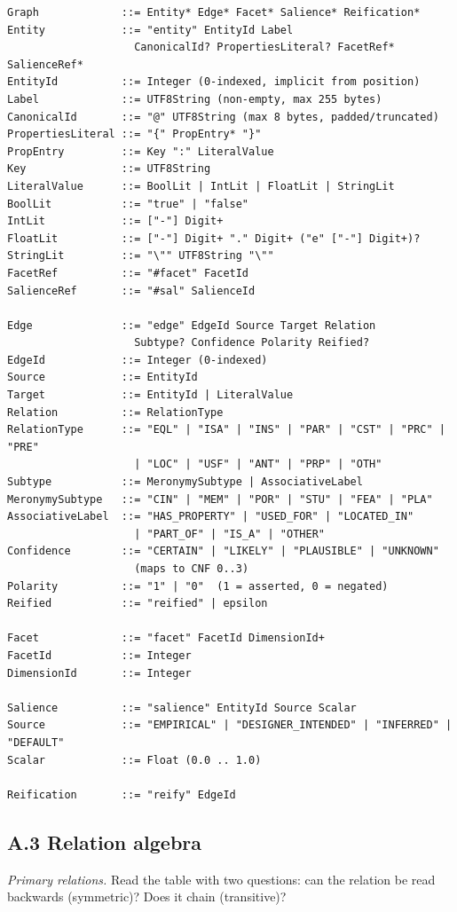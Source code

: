 \begin{verbatim}
Graph             ::= Entity* Edge* Facet* Salience* Reification*
Entity            ::= "entity" EntityId Label
                    CanonicalId? PropertiesLiteral? FacetRef* SalienceRef*
EntityId          ::= Integer (0-indexed, implicit from position)
Label             ::= UTF8String (non-empty, max 255 bytes)
CanonicalId       ::= "@" UTF8String (max 8 bytes, padded/truncated)
PropertiesLiteral ::= "{" PropEntry* "}"
PropEntry         ::= Key ":" LiteralValue
Key               ::= UTF8String
LiteralValue      ::= BoolLit | IntLit | FloatLit | StringLit
BoolLit           ::= "true" | "false"
IntLit            ::= ["-"] Digit+
FloatLit          ::= ["-"] Digit+ "." Digit+ ("e" ["-"] Digit+)?
StringLit         ::= "\"" UTF8String "\""
FacetRef          ::= "#facet" FacetId
SalienceRef       ::= "#sal" SalienceId

Edge              ::= "edge" EdgeId Source Target Relation
                    Subtype? Confidence Polarity Reified?
EdgeId            ::= Integer (0-indexed)
Source            ::= EntityId
Target            ::= EntityId | LiteralValue
Relation          ::= RelationType
RelationType      ::= "EQL" | "ISA" | "INS" | "PAR" | "CST" | "PRC" | "PRE"
                    | "LOC" | "USF" | "ANT" | "PRP" | "OTH"
Subtype           ::= MeronymySubtype | AssociativeLabel
MeronymySubtype   ::= "CIN" | "MEM" | "POR" | "STU" | "FEA" | "PLA"
AssociativeLabel  ::= "HAS_PROPERTY" | "USED_FOR" | "LOCATED_IN"
                    | "PART_OF" | "IS_A" | "OTHER"
Confidence        ::= "CERTAIN" | "LIKELY" | "PLAUSIBLE" | "UNKNOWN"
                    (maps to CNF 0..3)
Polarity          ::= "1" | "0"  (1 = asserted, 0 = negated)
Reified           ::= "reified" | epsilon

Facet             ::= "facet" FacetId DimensionId+
FacetId           ::= Integer
DimensionId       ::= Integer

Salience          ::= "salience" EntityId Source Scalar
Source            ::= "EMPIRICAL" | "DESIGNER_INTENDED" | "INFERRED" | "DEFAULT"
Scalar            ::= Float (0.0 .. 1.0)

Reification       ::= "reify" EdgeId
\end{verbatim}

\subsection*{A.3 Relation algebra}

\textit{Primary relations.} Read the table with two questions: can the relation be read backwards (symmetric)? Does it chain (transitive)?

